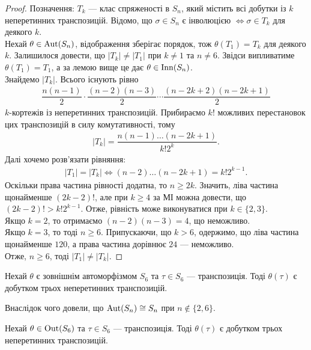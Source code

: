 \documentclass{math_library}
\begin{document}
\begin{proof}
Позначення: $T_k$ --- клас спряженості в $S_n$, який містить всі добутки із $k$ неперетинних транспозицій. Відомо, що $\sigma \in S_n$ є інволюцією $\iff \sigma \in T_k$ для деякого $k$.\\
Нехай $\theta \in \operatorname{Aut}(S_n)$, відображення зберігає порядок, тож $\theta(T_1) = T_k$ для деякого $k$. Залишилося довести, що $|T_k| \neq |T_1|$ при $k \neq 1$ та $n \neq 6$. Звідси випливатиме $\theta(T_1) = T_1$, а за лемою вище це дає $\theta \in \operatorname{Inn}(S_n)$.
\bigskip \\
Знайдемо $|T_k|$. Всього існують рівно
\begin{align*}
\dfrac{n(n-1)}{2} \cdot \dfrac{(n-2)(n-3)}{2} \cdots \dfrac{(n-2k+2)(n-2k+1)}{2}
\end{align*}
$k$-кортежів із неперетинних транспозицій. Прибираємо $k!$ можливих перестановок цих транспозицій в силу комутативності, тому
\begin{align*}
|T_k| = \dfrac{n(n-1) \dots (n-2k+1)}{k! 2^k}.
\end{align*}
Далі хочемо розв'язати рівняння:
\begin{align*}
|T_1| = |T_k| \iff (n-2) \dots (n-2k+1) = k! 2^{k-1}.
\end{align*}
Оскільки права частина рівності додатна, то $n \geq 2k$. Значить, ліва частина щонайменше $(2k-2)!$, але при $k \geq 4$ за МІ можна довести, що $(2k-2)! > k! 2^{k-1}$. Отже, рівність може виконуватися при $k \in \{2,3\}$.\\
Якщо $k = 2$, то отримаємо $(n-2)(n-3) = 4$, що неможливо.\\
Якщо $k = 3$, то тоді $n \geq 6$. Припускаючи, що $k > 6$, одержимо, що ліва частина щонайменше $120$, а права частина дорівнює $24$ --- неможливо.\\
Отже, $n \geq 6$, тоді $|T_1| \neq |T_k|$.
\end{proof}

\begin{corollary}
Нехай $\theta$ є зовнішнім автоморфізмом $S_6$ та $\tau \in S_6$ --- транспозиція. Тоді $\theta(\tau)$ є добутком трьох неперетинних транспозицій.
\end{corollary}

\begin{remark}
Внаслідок чого довели, що $\operatorname{Aut}(S_n) \cong S_n$ при $n \notin \{2,6\}$.
\end{remark}

\begin{corollary}
Нехай $\theta \in \operatorname{Out}(S_6)$ та $\tau \in S_6$ --- транспозиція. Тоді $\theta(\tau)$ є добутком трьох неперетинних транспозицій.
\end{corollary}
\end{document}
